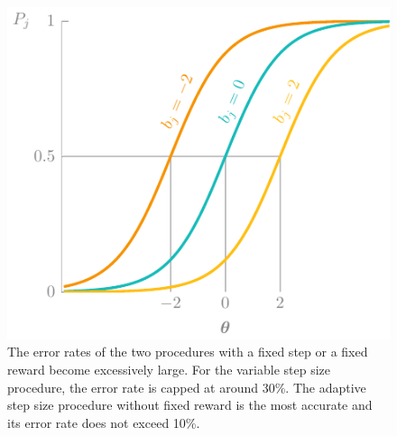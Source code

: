 \begin{figure}
    \centering
    \includegraphics[page=13]{03-education/figures/tikzfigures.pdf}
    \caption[Error rates of step size adjustment procedures]{The error rates of the two procedures with a fixed step or a fixed reward become excessively large. For the variable step size procedure, the error rate is capped at around 30\%. The adaptive step size procedure without fixed reward is the most accurate and its error rate does not exceed 10\%.}
    \label{fig:stepsize}
\end{figure}
